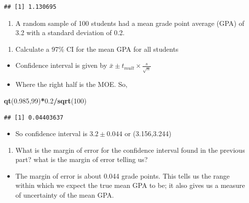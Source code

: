 \documentclass[
  openany]{book}
\newenvironment{Shaded}{\begin{snugshade}}{\end{snugshade}}
\newcommand{\DecValTok}[1]{\textcolor[rgb]{0.00,0.00,0.81}{#1}}
\newcommand{\FloatTok}[1]{\textcolor[rgb]{0.00,0.00,0.81}{#1}}
\newcommand{\FunctionTok}[1]{\textcolor[rgb]{0.13,0.29,0.53}{\textbf{#1}}}
\newcommand{\NormalTok}[1]{#1}
\newcommand{\SpecialCharTok}[1]{\textcolor[rgb]{0.81,0.36,0.00}{\textbf{#1}}}
\providecommand{\tightlist}{%
  \setlength{\itemsep}{0pt}\setlength{\parskip}{0pt}}
\begin{document}
\begin{verbatim}
## [1] 1.130695
\end{verbatim}

\begin{enumerate}
\def\labelenumi{\arabic{enumi}.}
\setcounter{enumi}{6}
\tightlist
\item
  A random sample of 100 students had a mean grade point average (GPA) of 3.2 with a standard deviation of 0.2.
\end{enumerate}

\begin{enumerate}
\def\labelenumi{\alph{enumi}.}
\tightlist
\item
  Calculate a 97\% CI for the mean GPA for all students
\end{enumerate}

\begin{itemize}
\item
  Confidence interval is given by \(\bar{x} \pm t_{mult} \times \frac{s}{\sqrt{n}}\)
\item
  Where the right half is the MOE. So,
\end{itemize}

\begin{Shaded}
\begin{Highlighting}[]
\FunctionTok{qt}\NormalTok{(}\FloatTok{0.985}\NormalTok{,}\DecValTok{99}\NormalTok{)}\SpecialCharTok{*}\FloatTok{0.2}\SpecialCharTok{/}\FunctionTok{sqrt}\NormalTok{(}\DecValTok{100}\NormalTok{)}
\end{Highlighting}
\end{Shaded}

\begin{verbatim}
## [1] 0.04403637
\end{verbatim}

\begin{itemize}
\tightlist
\item
  So confidence interval is \(3.2 \pm 0.044\) or (3.156,3.244)
\end{itemize}

\begin{enumerate}
\def\labelenumi{\alph{enumi}.}
\setcounter{enumi}{1}
\tightlist
\item
  What is the margin of error for the confidence interval found in the previous part? what is the margin of error telling us?
\end{enumerate}

\begin{itemize}
\tightlist
\item
  The margin of error is about 0.044 grade points. This tells us the range within which we expect the true mean GPA to be; it also gives us a measure of uncertainty of the mean GPA.
\end{itemize}
\end{document}
